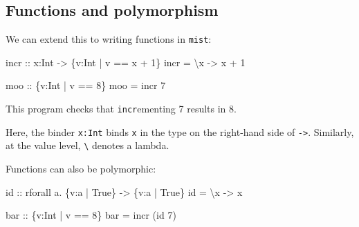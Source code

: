 \documentclass[
]{darts-v2021}
\newenvironment{Shaded}{}{}
\newcommand{\DataTypeTok}[1]{\textcolor[rgb]{0.56,0.13,0.00}{#1}}
\newcommand{\DecValTok}[1]{\textcolor[rgb]{0.25,0.63,0.44}{#1}}
\newcommand{\FunctionTok}[1]{\textcolor[rgb]{0.02,0.16,0.49}{#1}}
\newcommand{\NormalTok}[1]{#1}
\newcommand{\OperatorTok}[1]{\textcolor[rgb]{0.40,0.40,0.40}{#1}}
\newcommand{\OtherTok}[1]{\textcolor[rgb]{0.00,0.44,0.13}{#1}}
\begin{document}
\hypertarget{functions-and-polymorphism}{%
\subsection{Functions and
polymorphism}\label{functions-and-polymorphism}}

We can extend this to writing functions in \texttt{mist}:

\begin{Shaded}
\begin{Highlighting}[numbers=left,,]
\OtherTok{incr ::}\NormalTok{ x}\OperatorTok{:}\DataTypeTok{Int} \OtherTok{{-}\textgreater{}}\NormalTok{ \{v}\OperatorTok{:}\DataTypeTok{Int} \OperatorTok{|}\NormalTok{ v }\OperatorTok{==}\NormalTok{ x }\OperatorTok{+} \DecValTok{1}\NormalTok{\}}
\NormalTok{incr }\OtherTok{=}\NormalTok{ \textbackslash{}x }\OtherTok{{-}\textgreater{}}\NormalTok{ x }\OperatorTok{+} \DecValTok{1}

\OtherTok{moo ::}\NormalTok{ \{v}\OperatorTok{:}\DataTypeTok{Int} \OperatorTok{|}\NormalTok{ v }\OperatorTok{==} \DecValTok{8}\NormalTok{\}}
\NormalTok{moo }\OtherTok{=}\NormalTok{ incr }\DecValTok{7}
\end{Highlighting}
\end{Shaded}

This program checks that \texttt{incr}ementing 7 results in 8.

Here, the binder \texttt{x:Int} binds \texttt{x} in the type on the
right-hand side of \texttt{-\textgreater{}}. Similarly, at the value
level, \texttt{\textbackslash{}} denotes a lambda.

Functions can also be polymorphic:

\begin{Shaded}
\begin{Highlighting}[numbers=left,,firstnumber=7,]
\FunctionTok{id}\OtherTok{ ::}\NormalTok{ rforall a}\OperatorTok{.}\NormalTok{ \{v}\OperatorTok{:}\NormalTok{a }\OperatorTok{|} \DataTypeTok{True}\NormalTok{\} }\OtherTok{{-}\textgreater{}}\NormalTok{ \{v}\OperatorTok{:}\NormalTok{a }\OperatorTok{|} \DataTypeTok{True}\NormalTok{\}}
\FunctionTok{id} \OtherTok{=}\NormalTok{ \textbackslash{}x }\OtherTok{{-}\textgreater{}}\NormalTok{ x}

\OtherTok{bar ::}\NormalTok{ \{v}\OperatorTok{:}\DataTypeTok{Int} \OperatorTok{|}\NormalTok{ v }\OperatorTok{==} \DecValTok{8}\NormalTok{\}}
\NormalTok{bar }\OtherTok{=}\NormalTok{ incr (}\FunctionTok{id} \DecValTok{7}\NormalTok{)}
\end{Highlighting}
\end{Shaded}
\end{document}
